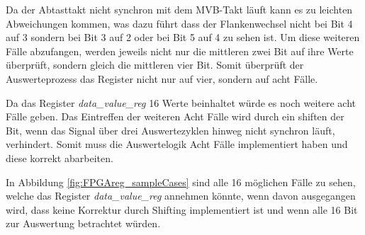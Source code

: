 




Da der Abtasttakt nicht synchron mit dem MVB-Takt läuft kann es zu leichten Abweichungen kommen, was dazu führt dass der Flankenwechsel nicht bei Bit 4 auf
3 sondern bei Bit 3 auf 2 oder bei Bit 5 auf 4 zu sehen ist. Um diese weiteren Fälle abzufangen, werden jeweils nicht nur die 
mittleren zwei Bit auf ihre Werte überprüft, sondern gleich die mittleren vier Bit. Somit überprüft der Auswerteprozess das Register nicht nur auf vier, sondern auf acht Fälle.

Da das Register \textit{data\_value\_reg} 16 Werte beinhaltet würde es noch weitere acht Fälle
geben. Das Eintreffen der weiteren Acht Fälle wird durch ein shiften der Bit, wenn das Signal über
drei Auswertezyklen hinweg nicht synchron läuft, verhindert. Somit muss die Auswertelogik Acht
Fälle implementiert haben und diese korrekt abarbeiten.

In Abbildung \ref{fig:FPGAreg_sampleCases} sind alle 16 möglichen Fälle zu 
sehen, welche das Register \textit{data\_value\_reg} annehmen könnte, wenn davon 
ausgegangen wird, dass keine Korrektur durch Shifting implementiert ist und wenn
alle 16 Bit zur Auswertung betrachtet würden.

